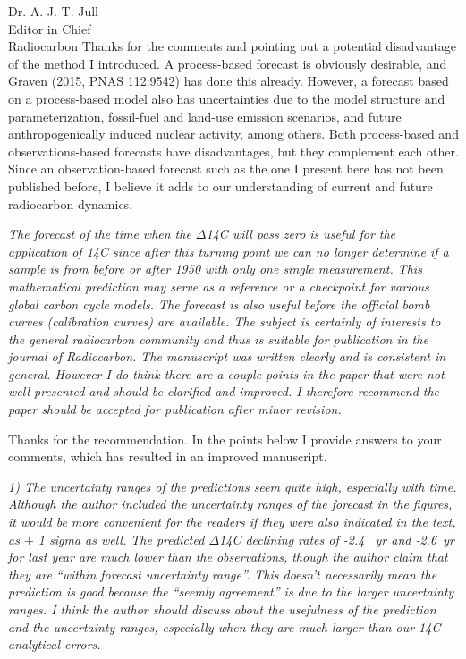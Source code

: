 \documentclass[11pt]{bgcletter}
\begin{document}
\begin{letter}{Dr. A. J. T. Jull \\
 Editor in Chief \\ Radiocarbon}
{\color{blue} Thanks for the comments and pointing out a potential disadvantage of the method I introduced. A process-based forecast is obviously desirable, and Graven (2015, PNAS 112:9542) has done this already. However, a forecast based on a process-based model also has uncertainties due to the model structure and parameterization, fossil-fuel and land-use emission scenarios, and future anthropogenically induced nuclear activity, among others. Both process-based and observations-based forecasts have disadvantages, but they complement each other. Since an observation-based forecast such as the one I present here has not been published before, I believe it adds to our understanding of current and future radiocarbon dynamics. }

{\it The forecast of the time when the $\Delta$14C will pass zero is useful for the application of 14C since after this turning point we can no longer determine if a sample is from before or after 1950 with only one single measurement. This mathematical prediction may serve as a reference or a checkpoint for various global carbon cycle models. The forecast is also useful before the official bomb curves (calibration curves) are available. The subject is certainly of interests to the general radiocarbon community and thus is suitable for publication in the journal of Radiocarbon. The manuscript was written clearly and is consistent in general. However I do think there are a couple points in the paper that were not well presented and should be clarified and improved. I therefore recommend the paper should be accepted for publication after minor revision.}

{\color{blue} Thanks for the recommendation. In the points below I provide answers to your comments, which has resulted in an improved manuscript. }

{\it 1) The uncertainty ranges of the predictions seem quite high, especially with time. Although the author included the uncertainty ranges of the forecast in the figures, it would be more convenient for the readers if they were also indicated in the text, as $\pm$ 1 sigma as well. The predicted $\Delta$14C declining rates of -2.4 \textperthousand \ yr and -2.6\textperthousand \ yr for last year are much lower than the observations, though the author claim that they are ``within forecast uncertainty range''.  This doesn't necessarily mean the prediction is good because the ``seemly agreement'' is due to the larger uncertainty ranges. I think the author should discuss about the usefulness of the prediction and the uncertainty ranges, especially when they are much larger than our 14C analytical errors. }


\end{letter}
\end{document}
